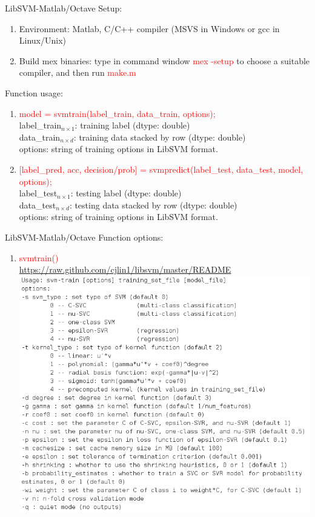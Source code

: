 \documentclass[compress,blue]{beamer}
\begin{document}
\begin{frame}{LibSVM-Matlab/Octave}
	Setup:
	\begin{enumerate}
	\item Environment: Matlab, C/C++ compiler (MSVS in Windows or gcc in Linux/Unix)
	\item Build mex binaries: type in command window \textcolor{red}{mex -setup} to choose a suitable compiler, and then run \textcolor{red}{make.m}
	\end{enumerate}
	Function usage:
	\begin{enumerate}
	\item \textcolor{red}{model = svmtrain(label\_train, data\_train, options);} \\
	label\_train$_{n\times 1}$: training label (dtype: double)\\
	data\_train$_{n\times d}$: training data stacked by row (dtype: double)\\
	options: string of training options in LibSVM format.
	\item \textcolor{red}{[label\_pred, acc, decision/prob] = svmpredict(label\_test, data\_test, model, options);} \\
	label\_test$_{n\times 1}$: testing label (dtype: double)\\
	data\_test$_{n\times d}$: testing data stacked by row (dtype: double)\\
	options: string of training options in LibSVM format.
	\end{enumerate}
\end{frame}

\begin{frame}{LibSVM-Matlab/Octave}
	Function options:
	\begin{enumerate}
		\item \textcolor{red}{svmtrain()} \\
		\url{https://raw.github.com/cjlin1/libsvm/master/README}\\
			\centering
			\includegraphics[width=0.8\linewidth]{figures/svmtrain.png}
	\end{enumerate}
\end{frame}
\end{document}
